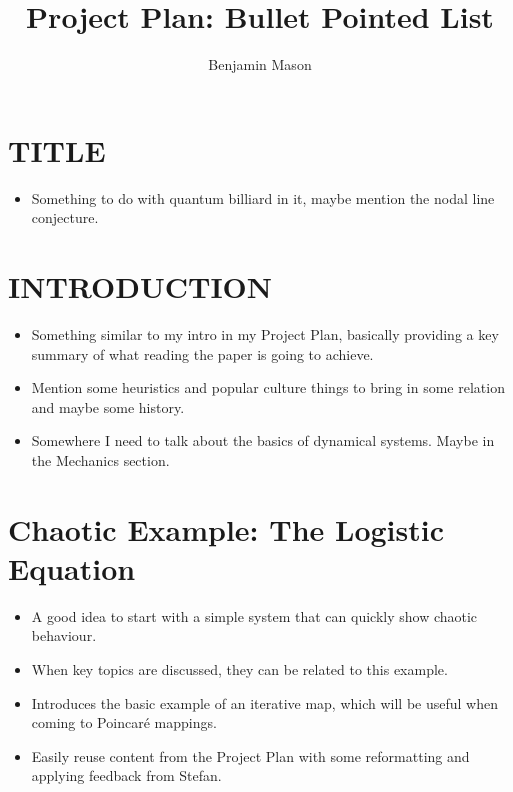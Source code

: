 \documentclass[12pt,a4paper]{amsart}
\title{Project Plan: Bullet Pointed List}
\author{Benjamin Mason}
\begin{document}
\maketitle

\section*{TITLE}
\begin{itemize}
    \item Something to do with quantum billiard in it, maybe mention the nodal line conjecture.
\end{itemize}

\section*{INTRODUCTION}
\begin{itemize}
    \item Something similar to my intro in my Project Plan, basically providing a key summary of what reading the paper is going to achieve. 
    \item Mention some heuristics and popular culture things to bring in some relation and maybe some history.
    \item Somewhere I need to talk about the basics of dynamical systems. Maybe in the Mechanics section.
\end{itemize}

\section*{Chaotic Example: The Logistic Equation}
\begin{itemize}
    \item A good idea to start with a simple system that can quickly show chaotic behaviour.
    \item When key topics are discussed, they can be related to this example.
    \item Introduces the basic example of an iterative map, which will be useful when coming to Poincaré mappings.
    \item Easily reuse content from the Project Plan with some reformatting and applying feedback from Stefan.
\end{itemize}
\end{document}
